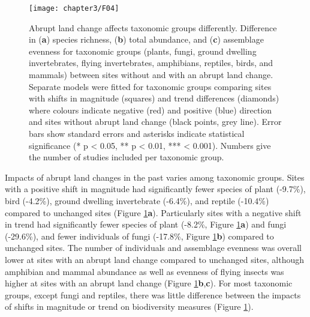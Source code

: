 \begin{figure}[!htb]
\centering
\texttt{[image: chapter3/F04]}
\caption{Abrupt land change affects taxonomic groups differently. Difference in (\textbf{a}) species richness, (\textbf{b}) total abundance, and (\textbf{c}) assemblage evenness for taxonomic groups (plants, fungi, ground dwelling invertebrates, flying invertebrates, amphibians, reptiles, birds, and mammals) between sites without and with an abrupt land change. Separate models were fitted for taxonomic groups comparing sites with shifts in magnitude (squares) and trend differences (diamonds) where colours indicate negative (red) and positive (blue) direction and sites without abrupt land change (black points, grey line). Error bars show standard errors and asterisks indicate statistical significance (* p < 0.05, ** p < 0.01, *** < 0.001). Numbers give the number of studies included per taxonomic group.}
\label{F03_04}
\end{figure}

Impacts of abrupt land changes in the past varies among taxonomic groups. Sites with a positive shift in magnitude had significantly fewer species of plant (-9.7\%), bird (-4.2\%), ground dwelling invertebrate (-6.4\%), and reptile (-10.4\%) compared to unchanged sites (Figure \ref{F03_04}\textbf{a}). Particularly sites with a negative shift in trend had significantly fewer species of plant (-8.2\%, Figure \ref{F03_04}\textbf{a}) and fungi (-29.6\%), and fewer individuals of fungi (-17.8\%, Figure \ref{F03_04}\textbf{b}) compared to unchanged sites. The number of individuals and assemblage evenness was overall lower at sites with an abrupt land change compared to unchanged sites, although amphibian and mammal abundance as well as evenness of flying insects was higher at sites with an abrupt land change (Figure \ref{F03_04}\textbf{b},\textbf{c}). For most taxonomic groups, except fungi and reptiles, there was little difference between the impacts of shifts in magnitude or trend on biodiversity measures (Figure \ref{F03_04}).

